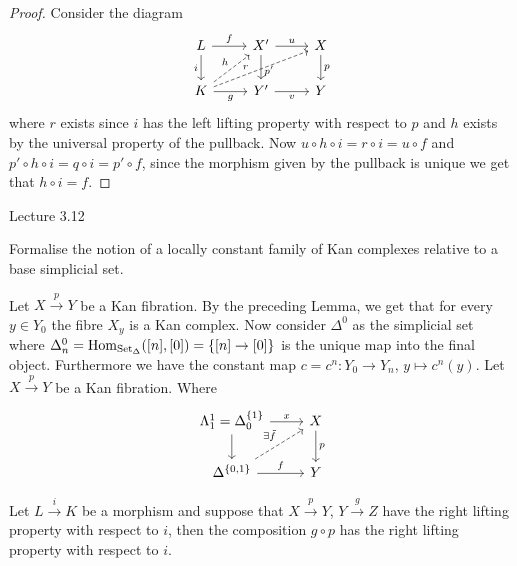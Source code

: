 \begin{proof}
    Consider the diagram
    \[
    \begin{tikzcd}
        L
        \ar[r,"f"]
        \ar[d,"i"']
        &
        X'
        \arrow[d,"p'" pos=0.65]
        \ar[r, "u"]
        &
        X
        \ar[d,"p"]
        \\
        K
        \arrow[r,"g"']
        \ar[rru, dashed, "r" pos= 0.4]
        \ar[ru, dashed, "h"]
        &
        Y'
        \ar[r,"v"']
        &
        Y    
    \end{tikzcd}
    \]
    where $r$ exists since $i$ has the left lifting property with respect to $p$ and $h$ exists by the universal property of the pullback.
    Now $u \circ h \circ i = r \circ i = u \circ f$ and $p' \circ h \circ i = q \circ i = p' \circ f$, since the  morphism given by the pullback is unique we get that $h \circ i = f$.
\end{proof}

Lecture 3.12 

Formalise the notion of a locally constant family of Kan complexes relative to a base simplicial set.

\begin{defi}
    Let $X \xrightarrow{p} Y$ be a Kan fibration. 
    By the preceding Lemma, we get that for every $y\in Y_0$ the fibre $X_y$ is a Kan complex. 
    Now consider $\Delta^0$ as the simplicial set where $\Delta^0_n=\operatorname{Hom}_{\operatorname{Set}_{\Delta}}([n],[0])=\{[n] \to [0]\}$ is the unique map into the final object.
    Furthermore we have the constant map $c=c^n\colon Y_0 \to  Y_n$, $y \mapsto c^n(y)$.
    Let $X \xrightarrow{p} Y$ be a Kan fibration.
    Where 
    \[
    \begin{tikzcd}
        \Lambda_1^1=\Delta^{\{1\}}_0
        \ar[r,"x"]
        \ar[d]
        &
        X
        \ar[d,"p"]
        \\
        \Delta^{\{0,1\}}
        \ar[r,"f"]
        \ar[ru, dashed, "\exists \Tilde{f}"]
        &
        Y
    \end{tikzcd}
    \]
\end{defi}


\begin{prop}
\label{comp_Kan_fib}
    Let $L \xrightarrow{i} K$ be a morphism and suppose that $X \xrightarrow{p} Y$, $Y \xrightarrow{g} Z$ have the right lifting property with respect to $i$, then the composition $g \circ p$ has the right lifting property with respect to $i$.
\end{prop}


